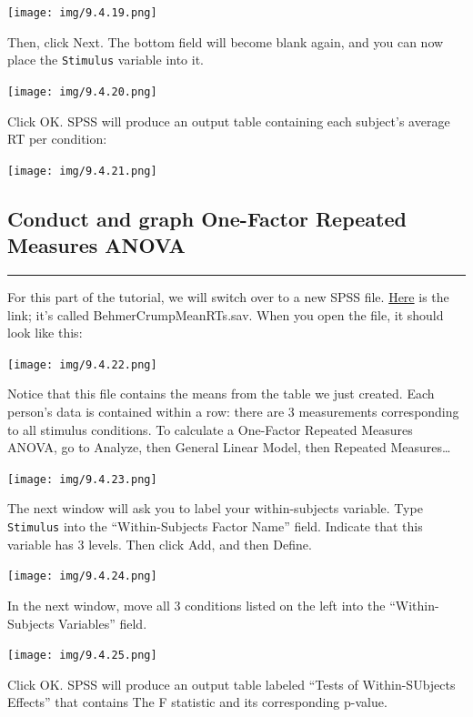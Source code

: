 \documentclass[
]{book}
\begin{document}
\texttt{[image: img/9.4.19.png]}

Then, click {Next}. The bottom field will become blank again, and you can now place the \texttt{Stimulus} variable into it.

\texttt{[image: img/9.4.20.png]}

Click {OK}. SPSS will produce an output table containing each subject's average RT per condition:

\texttt{[image: img/9.4.21.png]}

\hypertarget{conduct-and-graph-one-factor-repeated-measures-anova}{%
\subsection{Conduct and graph One-Factor Repeated Measures ANOVA}\label{conduct-and-graph-one-factor-repeated-measures-anova}}

\begin{center}\rule{0.5\linewidth}{0.5pt}\end{center}

For this part of the tutorial, we will switch over to a new SPSS file. \href{https://github.com/CrumpLab/statisticsLab/blob/master/data/spssdata/BehmerCrumpMeanRTs.sav}{Here} is the link; it's called BehmerCrumpMeanRTs.sav. When you open the file, it should look like this:

\texttt{[image: img/9.4.22.png]}

Notice that this file contains the means from the table we just created. Each person's data is contained within a row: there are 3 measurements corresponding to all stimulus conditions. To calculate a One-Factor Repeated Measures ANOVA, go to {Analyze}, then {General Linear Model}, then {Repeated Measures\ldots{}}

\texttt{[image: img/9.4.23.png]}

The next window will ask you to label your within-subjects variable. Type \texttt{Stimulus} into the ``Within-Subjects Factor Name'' field. Indicate that this variable has 3 levels. Then click {Add}, and then {Define}.

\texttt{[image: img/9.4.24.png]}

In the next window, move all 3 conditions listed on the left into the ``Within-Subjects Variables'' field.

\texttt{[image: img/9.4.25.png]}

Click {OK}. SPSS will produce an output table labeled ``Tests of Within-SUbjects Effects'' that contains The F statistic and its corresponding p-value.
\end{document}

